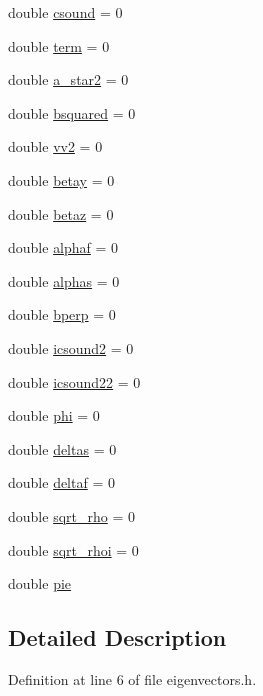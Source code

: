 \begin{DoxyCompactItemize}
\item 
double \hyperlink{classEigen_ab8e8bcd0685d32e9052619cd58a3919c}{csound} = 0
\item 
double \hyperlink{classEigen_a90d6d3a6b61e696c11a2e2332b1ad776}{term} = 0
\item 
double \hyperlink{classEigen_a02c0c720bcf46cf277103513c7b10ba0}{a\+\_\+star2} = 0
\item 
double \hyperlink{classEigen_a5fa9487346d50a62fcd973ce397372a5}{bsquared} = 0
\item 
double \hyperlink{classEigen_adc85510c33dea4d030fbba660fa62aa3}{vv2} = 0
\item 
double \hyperlink{classEigen_a56747b8f4e73bb7e64cfaace007931e2}{betay} = 0
\item 
double \hyperlink{classEigen_a47a0a29c382be902fcabe92d37ba5500}{betaz} = 0
\item 
double \hyperlink{classEigen_aed80a042db0d0ced7b3da35981b2013d}{alphaf} = 0
\item 
double \hyperlink{classEigen_a8836310ec9c85daa434ff65f1c711120}{alphas} = 0
\item 
double \hyperlink{classEigen_acdb30615460d877c80b0005f15ffcc49}{bperp} = 0
\item 
double \hyperlink{classEigen_a00f80efb3753a6573c599d9aef539c99}{icsound2} = 0
\item 
double \hyperlink{classEigen_afdfefe363a4791580f5afa9c3c54a820}{icsound22} = 0
\item 
double \hyperlink{classEigen_a205ed994f4da55a9663a1cf8ddac34fa}{phi} = 0
\item 
double \hyperlink{classEigen_aeba5919259de19a63da3e9fd6ea80533}{deltas} = 0
\item 
double \hyperlink{classEigen_aabedb922cff2469aeaa9c75d74c2f151}{deltaf} = 0
\item 
double \hyperlink{classEigen_a3422990af7342f781822fe63ceecc2f4}{sqrt\+\_\+rho} = 0
\item 
double \hyperlink{classEigen_a9b648c2ff2e86e097527249afc860992}{sqrt\+\_\+rhoi} = 0
\item 
double \hyperlink{classEigen_a71253de919978058cd2b94e7834b019f}{pie}
\end{DoxyCompactItemize}


\subsection{Detailed Description}


Definition at line 6 of file eigenvectors.\+h.



